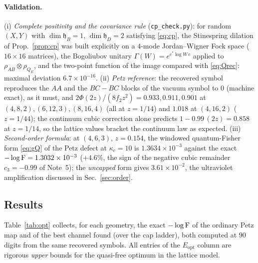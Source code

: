 \documentclass[11pt]{article}
\newcommand{\hh}{\mathfrak h}
\newcommand{\Erec}{E_{\mathrm{opt}}}
\begin{document}
\paragraph{Validation.}
(i) \emph{Complete positivity and the covariance rule}
(\texttt{cp\_check.py}): for random \((X,Y)\) with \(\dim\hh_B=1\),
\(\dim\hh_D=2\) satisfying \eqref{eq:cp}, the Stinespring dilation of
Prop.~\ref{prop:cp} was built explicitly on a \(4\)-mode Jordan--Wigner Fock
space (\(16\times16\) matrices), the Bogoliubov unitary \(\Gamma(W)=e^{c^*\log W\,c}\)
applied to \(\rho_{AB}\otimes\rho_{Q_E}\), and the two-point function of the
image compared with \eqref{eq:Qrec}: maximal deviation \(6.7\times10^{-16}\).
(ii) \emph{Petz reference}: the recovered symbol reproduces the \(AA\) and the
\(BC\!-\!BC\) blocks of the vacuum symbol to \(0\) (machine exact), as it must,
and \(2\Phi(2z)/(8f_2z^2)=0.933,0.911,0.901\) at \((4,8,2),(6,12,3),(8,16,4)\)
(all at \(z=1/14\)) and \(1.018\) at \((4,16,2)\) (\(z=1/44\)); the continuum
cubic correction alone predicts \(1-0.99\,(2z)=0.858\) at \(z=1/14\), so the
lattice values bracket the continuum law as expected.
(iii) \emph{Second-order formula}: at \((4,6,3)\), \(z=0.154\), the windowed
quantum-Fisher form \eqref{eq:gQ} of the Petz defect at \(\kappa_c=10\) is
\(1.3634\times10^{-3}\) against the exact \(-\log\operatorname{F}=1.3032\times10^{-3}\)
(\(+4.6\%\), the sign of the negative cubic remainder \(c_3=-0.99\) of Note~5);
the \emph{uncapped} form gives \(3.61\times10^{-2}\), the ultraviolet
amplification discussed in Sec.~\ref{sec:order}.



\subsection{Results}\label{sec:results}

Table~\ref{tab:opt} collects, for each geometry, the exact \(-\log\operatorname{F}\) of the
ordinary Petz map and of the best channel found (over the cap ladder), both
computed at \(90\) digits from the same recovered symbols.  All entries of the
\(\Erec\) column are rigorous \emph{upper} bounds for the quasi-free optimum in
the lattice model.
\end{document}
